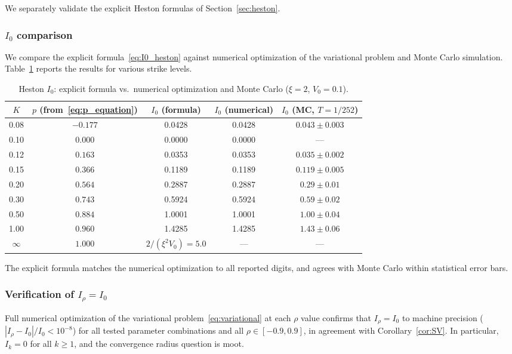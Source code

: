 \documentclass[11pt]{article}
\theoremstyle{definition}
\begin{document}
We separately validate the explicit Heston formulas of Section~\ref{sec:heston}.

\subsubsection{$I_0$ comparison}

We compare the explicit formula~\eqref{eq:I0_heston} against numerical optimization of the variational problem and Monte Carlo simulation. Table~\ref{tab:heston_I0} reports the results for various strike levels.

\begin{table}[h]
\centering
\caption{Heston $I_0$: explicit formula vs.\ numerical optimization and Monte Carlo ($\xi = 2$, $V_0 = 0.1$).}\label{tab:heston_I0}
\begin{tabular}{c|c|cc|c}
\hline
$K$ & $p$ (from~\eqref{eq:p_equation}) & $I_0$ (formula) & $I_0$ (numerical) & $I_0$ (MC, $T=1/252$) \\
\hline
0.08 & $-0.177$ & 0.0428 & 0.0428 & $0.043 \pm 0.003$ \\
0.10 & $0.000$ & 0.0000 & 0.0000 & --- \\
0.12 & $0.163$ & 0.0353 & 0.0353 & $0.035 \pm 0.002$ \\
0.15 & $0.366$ & 0.1189 & 0.1189 & $0.119 \pm 0.005$ \\
0.20 & $0.564$ & 0.2887 & 0.2887 & $0.29 \pm 0.01$ \\
0.30 & $0.743$ & 0.5924 & 0.5924 & $0.59 \pm 0.02$ \\
0.50 & $0.884$ & 1.0001 & 1.0001 & $1.00 \pm 0.04$ \\
1.00 & $0.960$ & 1.4285 & 1.4285 & $1.43 \pm 0.06$ \\
$\infty$ & $1.000$ & $2/(\xi^2 V_0) = 5.0$ & --- & --- \\
\hline
\end{tabular}
\end{table}

The explicit formula matches the numerical optimization to all reported digits, and agrees with Monte Carlo within statistical error bars.

\subsubsection{Verification of $I_\rho = I_0$}

Full numerical optimization of the variational problem~\eqref{eq:variational} at each $\rho$ value confirms that $I_\rho = I_0$ to machine precision ($|I_\rho - I_0|/I_0 < 10^{-8}$) for all tested parameter combinations and all $\rho \in [-0.9, 0.9]$, in agreement with Corollary~\ref{cor:SV}. In particular, $I_k = 0$ for all $k \geq 1$, and the convergence radius question is moot.
\end{document}
